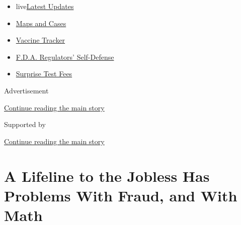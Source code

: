 \begin{itemize}
\tightlist
\item
  live\href{https://www.nytimes3xbfgragh.onion/2020/09/11/world/covid-19-coronavirus.html?name=styln-coronavirus-markets\&region=TOP_BANNER\&block=storyline_menu_recirc\&action=click\&pgtype=Article\&impression_id=15b99310-f4b6-11ea-89a3-d9fd6cbe23e4\&variant=undefined}{Latest
  Updates}
\item
  \href{https://www.nytimes3xbfgragh.onion/interactive/2020/us/coronavirus-us-cases.html?name=styln-coronavirus-markets\&region=TOP_BANNER\&block=storyline_menu_recirc\&action=click\&pgtype=Article\&impression_id=15b99311-f4b6-11ea-89a3-d9fd6cbe23e4\&variant=undefined}{Maps
  and Cases}
\item
  \href{https://www.nytimes3xbfgragh.onion/interactive/2020/science/coronavirus-vaccine-tracker.html?name=styln-coronavirus-markets\&region=TOP_BANNER\&block=storyline_menu_recirc\&action=click\&pgtype=Article\&impression_id=15b99312-f4b6-11ea-89a3-d9fd6cbe23e4\&variant=undefined}{Vaccine
  Tracker}
\item
  \href{https://www.nytimes3xbfgragh.onion/2020/09/10/us/politics/fda-coronavirus-vaccine.html?name=styln-coronavirus-markets\&region=TOP_BANNER\&block=storyline_menu_recirc\&action=click\&pgtype=Article\&impression_id=15b99313-f4b6-11ea-89a3-d9fd6cbe23e4\&variant=undefined}{F.D.A.
  Regulators' Self-Defense}
\item
  \href{https://www.nytimes3xbfgragh.onion/2020/09/09/upshot/coronavirus-surprise-test-fees.html?name=styln-coronavirus-markets\&region=TOP_BANNER\&block=storyline_menu_recirc\&action=click\&pgtype=Article\&impression_id=15b99314-f4b6-11ea-89a3-d9fd6cbe23e4\&variant=undefined}{Surprise
  Test Fees}
\end{itemize}

Advertisement

\protect\hyperlink{after-top}{Continue reading the main story}

Supported by

\protect\hyperlink{after-sponsor}{Continue reading the main story}

\hypertarget{a-lifeline-to-the-jobless-has-problems-with-fraud-and-with-math}{%
\section{A Lifeline to the Jobless Has Problems With Fraud, and With
Math}\label{a-lifeline-to-the-jobless-has-problems-with-fraud-and-with-math}}

